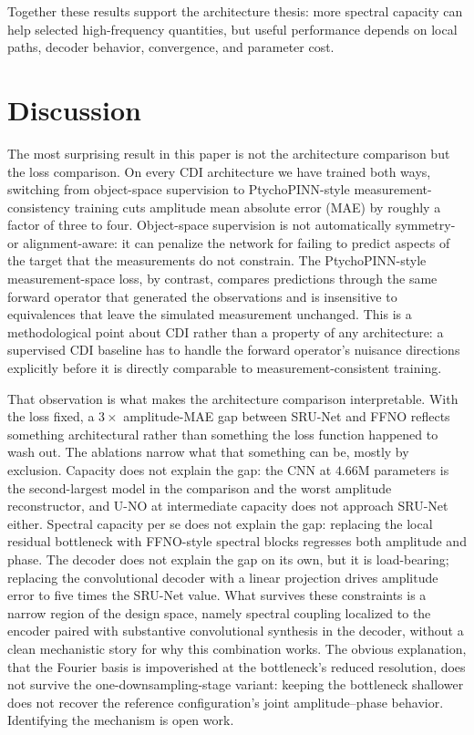 \documentclass[11pt]{article}
\begin{document}
Together these results support the architecture thesis: more spectral capacity
can help selected high-frequency quantities, but useful performance depends on
local paths, decoder behavior, convergence, and parameter cost.

\fi

\section{Discussion}

The most surprising result in this paper is not the architecture comparison
but the loss comparison. On every CDI architecture we have trained both ways,
switching from object-space supervision to PtychoPINN-style
measurement-consistency training cuts amplitude mean absolute error (MAE) by
roughly a factor of three to four. Object-space supervision is not
automatically symmetry- or alignment-aware: it can penalize the network for
failing to predict aspects of the target that the measurements do not
constrain. The PtychoPINN-style measurement-space loss, by contrast, compares
predictions through the same forward operator that generated the observations
and is insensitive to equivalences that leave the simulated measurement
unchanged. This is a methodological point about CDI rather than a property of
any architecture: a supervised CDI baseline has to handle the forward
operator's nuisance directions explicitly before it is directly comparable to
measurement-consistent training.

That observation is what makes the architecture comparison interpretable.
With the loss fixed, a $3\times$ amplitude-MAE gap between SRU-Net and FFNO
reflects something architectural rather than something the loss function
happened to wash out. The ablations narrow what that something can be, mostly
by exclusion. Capacity does not explain the gap: the CNN at $4.66\mathrm{M}$
parameters is the second-largest model in the comparison and the worst
amplitude reconstructor, and U-NO at intermediate capacity does not approach
SRU-Net either. Spectral capacity per se does not explain the gap: replacing
the local residual bottleneck with FFNO-style spectral blocks regresses both
amplitude and phase. The decoder does not explain the gap on its own, but it
is load-bearing; replacing the convolutional decoder with a linear projection
drives amplitude error to five times the SRU-Net value. What survives these
constraints is a narrow region of the design space, namely spectral coupling
localized to the encoder paired with substantive convolutional synthesis in
the decoder, without a clean mechanistic story for why this combination
works. The obvious explanation, that the Fourier basis is impoverished at
the bottleneck's reduced resolution, does not survive the one-downsampling-stage
variant: keeping the bottleneck shallower does not recover the reference
configuration's joint amplitude--phase behavior. Identifying the mechanism
is open work.
\end{document}
